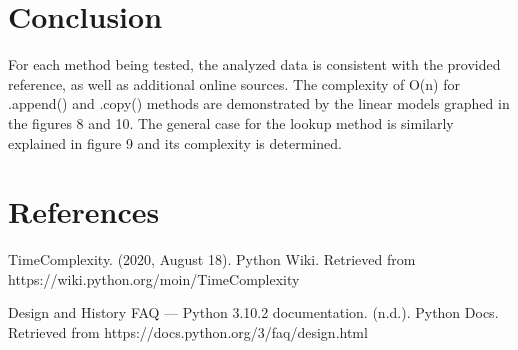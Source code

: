 \documentclass[12pt]{article}
\begin{document}
\section{Conclusion}

For each method being tested, the analyzed data is consistent with the provided reference, as well as additional online sources. The complexity of O(n) for .append() and .copy() methods are demonstrated by the linear models graphed in the figures 8 and 10. The general case for the lookup method is similarly explained in figure 9 and its complexity is determined.

\newpage\section*{References}
\begin{enumerate}[label={[\arabic*]}]
\item	TimeComplexity. (2020, August 18). Python Wiki. Retrieved from \newline https://wiki.python.org/moin/TimeComplexity
\item	Design and History FAQ — Python 3.10.2 documentation. (n.d.). Python Docs. Retrieved from https://docs.python.org/3/faq/design.html
\end{enumerate}
\end{document}
